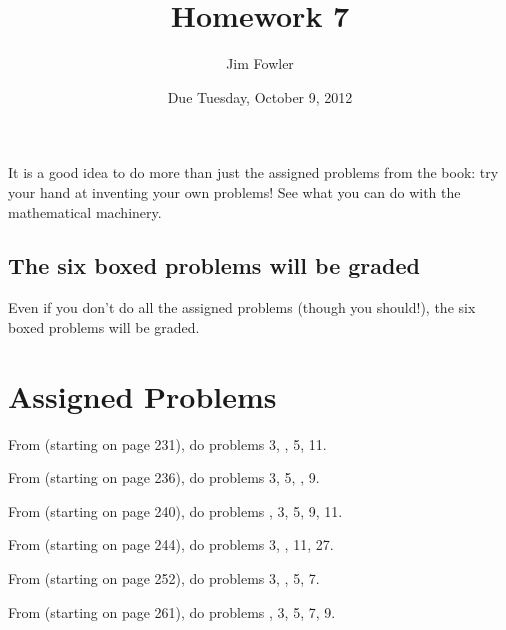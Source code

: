 \documentclass[12pt]{handout}
\title{Homework 7}
\date{Due Tuesday, October  9, 2012}
\author{Jim Fowler}
\begin{document}
\maketitle





It is a good idea to do more than just the assigned problems from the
book: try your hand at inventing your own problems!  See what you can do with the
mathematical machinery.





\subsection*{The six boxed problems will be graded}
Even if you don't do all the assigned problems (though you should!), the six boxed problems will be graded.

\section*{Assigned Problems}

From  (starting on page 231),
do problems 3, , 5, 11.
\vspace{1ex}

From  (starting on page 236),
do problems 3, 5, , 9.
\vspace{1ex}

From  (starting on page 240),
do problems , 3, 5, 9, 11.
\vspace{1ex}

From  (starting on page 244),
do problems 3, , 11, 27.
\vspace{1ex}

From  (starting on page 252),
do problems 3, , 5, 7.
\vspace{1ex}

From  (starting on page 261),
do problems , 3, 5, 7, 9.
\vspace{1ex}
\end{document}

